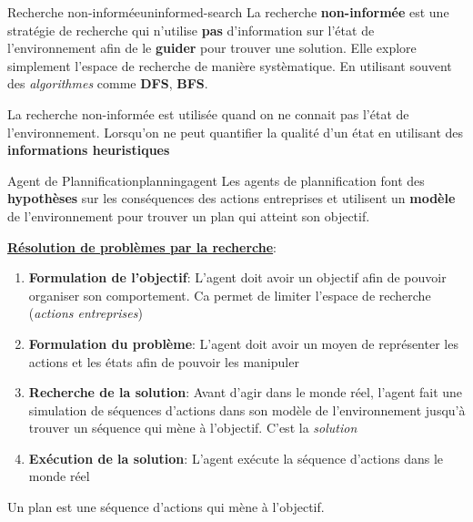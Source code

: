 
\begin{definition}{Recherche non-informée}{uninformed-search}
    La recherche \textbf{non-informée} est une stratégie de recherche qui n'utilise \textbf{pas}
    d'information sur l'état de l'environnement afin de le \textbf{guider} pour trouver une solution.
    Elle explore simplement l'espace de recherche de manière systèmatique. En utilisant souvent 
    des \textit{algorithmes} comme \textbf{DFS}, \textbf{BFS}.
\end{definition}

\begin{remark}\leavevmode
    La recherche non-informée est utilisée quand on ne connait pas l'état de l'environnement. 
    Lorsqu'on ne peut quantifier la qualité d'un état en utilisant des \textbf{informations heuristiques}
\end{remark}

\begin{definition}{Agent de Plannification}{planningagent}
    Les agents de plannification font des \textbf{hypothèses} sur les conséquences des actions entreprises
    et utilisent un \textbf{modèle} de l'environnement pour trouver un plan qui atteint son objectif.
\end{definition}

\underline{\textbf{Résolution de problèmes par la recherche}}:
\begin{enumerate}
    \item \textbf{Formulation de l'objectif}: L'agent doit avoir un objectif afin 
        de pouvoir organiser son comportement. Ca permet de limiter l'espace de recherche (\textit{actions entreprises})
    \item \textbf{Formulation du problème}: L'agent doit avoir un moyen de représenter les actions et les états 
        afin de pouvoir les manipuler
    \item \textbf{Recherche de la solution}: Avant d'agir dans le monde réel, l'agent  fait  une 
        simulation de séquences d'actions dans son modèle de l'environnement jusqu'à trouver un séquence 
        qui mène à l'objectif. C'est  la \textit{solution}
    \item \textbf{Exécution de la solution}: L'agent exécute la séquence d'actions dans le monde réel
\end{enumerate}

\begin{note}
    Un plan est une séquence d'actions qui mène à l'objectif.
\end{note}

